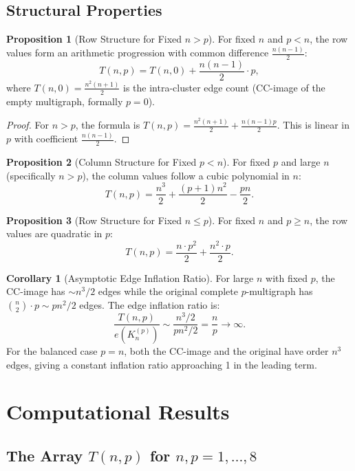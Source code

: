 \documentclass[11pt,a4paper]{article}
\theoremstyle{definition}
\newtheorem{proposition}{Proposition}[section]
\newtheorem{corollary}{Corollary}[section]
\begin{document}
\subsection{Structural Properties}

\begin{proposition}[Row Structure for Fixed $n > p$]
For fixed $n$ and $p < n$, the row values form an arithmetic progression with common difference $\frac{n(n-1)}{2}$:
\[
T(n, p) = T(n, 0) + \frac{n(n-1)}{2} \cdot p,
\]
where $T(n, 0) = \frac{n^2(n+1)}{2}$ is the intra-cluster edge count (CC-image of the empty multigraph, formally $p = 0$).
\end{proposition}

\begin{proof}
For $n > p$, the formula is $T(n, p) = \frac{n^2(n+1)}{2} + \frac{n(n-1)p}{2}$. This is linear in $p$ with coefficient $\frac{n(n-1)}{2}$.
\end{proof}

\begin{proposition}[Column Structure for Fixed $p < n$]
For fixed $p$ and large $n$ (specifically $n > p$), the column values follow a cubic polynomial in $n$:
\[
T(n, p) = \frac{n^3}{2} + \frac{(p+1)n^2}{2} - \frac{pn}{2}.
\]
\end{proposition}

\begin{proposition}[Row Structure for Fixed $n \leq p$]
For fixed $n$ and $p \geq n$, the row values are quadratic in $p$:
\[
T(n, p) = \frac{n \cdot p^2}{2} + \frac{n^2 \cdot p}{2}.
\]
\end{proposition}

\begin{corollary}[Asymptotic Edge Inflation Ratio]
For large $n$ with fixed $p$, the CC-image has $\sim n^3/2$ edges while the original complete $p$-multigraph has $\binom{n}{2} \cdot p \sim pn^2/2$ edges. The edge inflation ratio is:
\[
\frac{T(n, p)}{e(K_n^{(p)})} \sim \frac{n^3/2}{pn^2/2} = \frac{n}{p} \to \infty.
\]
For the balanced case $p = n$, both the CC-image and the original have order $n^3$ edges, giving a constant inflation ratio approaching 1 in the leading term.
\end{corollary}

\section{Computational Results}

\subsection{The Array $T(n, p)$ for $n, p = 1, \ldots, 8$}
\end{document}
